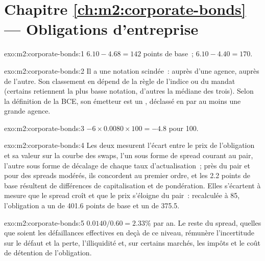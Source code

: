 \section*{Chapitre \ref{ch:m2:corporate-bonds} --- Obligations d'entreprise}

\begin{solution}{exo:m2:corporate-bonds:1}
 $6.10 - 4.68 = 142$ points de base~;  $6.10 - 4.40 = 170$.
\end{solution}

\begin{solution}{exo:m2:corporate-bonds:2}
Il a une notation scindée~:  auprès d'une agence,  auprès de l'autre.
Son classement en  dépend de la règle de l'indice ou du mandat (certains retiennent
la plus basse notation, d'autres la médiane des trois). Selon la définition de la BCE, son émetteur est
un , déclassé en  par au moins une grande agence.
\end{solution}

\begin{solution}{exo:m2:corporate-bonds:3}
$-6 \times 0.0080 \times 100 = -4.8$ pour 100.
\end{solution}

\begin{solution}{exo:m2:corporate-bonds:4}
Les deux mesurent l'écart entre le prix de l'obligation et sa valeur sur la courbe des swaps, l'un sous forme de spread courant au pair, l'autre
sous forme de décalage de chaque taux d'actualisation~; près du pair et pour des spreads modérés,
ils concordent au premier ordre, et les 2.2 points de base résultent de différences de capitalisation et de pondération.
Elles s'écartent à mesure que le spread croît et que le prix
s'éloigne du pair~: recalculée à 85, l'obligation a un  de 401.6 points de base et un
 de 375.5.
\end{solution}

\begin{solution}{exo:m2:corporate-bonds:5}
$0.0140/0.60 = 2.33\%$ par an. Le reste du spread, quelles que soient les défaillances effectives
en deçà de ce niveau, rémunère l'incertitude sur le défaut et la perte,
l'illiquidité et, sur certains marchés, les impôts et le coût de détention de l'obligation.
\end{solution}

